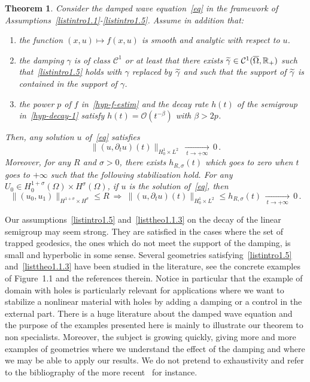 \documentclass[11pt]{article}
\newtheorem{theo}{Theorem}[section]
\theoremstyle{definition}
\numberwithin{equation}{section}
\numberwithin{figure}{section}
\numberwithin{table}{section}
\newcommand{\RR}{\mathbb{R}}
\newcommand{\Cc}{\mathcal{C}}
\newcommand{\Oc}{\mathcal{O}}
\newcommand*{\alphenumi}{\renewcommand*{\theenumi}{\alph{enumi}}}
\let\oldtilde\tilde
\renewcommand*{\tilde}[1]{\mathchoice{\widetilde{#1}}{\widetilde{#1}}{\oldtilde{#1}}{\oldtilde{#1}}}\let\oldexists\exists
\renewcommand*{\exists}{\mathrel{\oldexists}}
\begin{document}
\begin{theo}\label{th1}
Consider the damped wave equation~\eqref{eq} in the framework of Assumptions~\eqref{listintro1.1}-\eqref{listintro1.5}. Assume in addition that:
\begin{enumerate}\alphenumi
\item \label{listtheo1.1.1}the function $(x,u)\mapsto f(x,u)$ is smooth and analytic with respect to $u$.
\item \label{listtheo1.1.2}the damping $\gamma$ is of class $\Cc^1$ or at least that there exists $\tilde\gamma\in\Cc^1(\overline\Omega,\RR_+)$ such that~\eqref{listintro1.5} holds with $\gamma$ replaced by $\tilde\gamma$ and such that the support of $\tilde\gamma$ is contained in the support of $\gamma$.
\item \label{listtheo1.1.3}the power $p$ of $f$ in~\eqref{hyp-f-estim} and the decay rate $h(t)$ of the semigroup in~\eqref{hyp-decay-1} satisfy $h(t)=\Oc(t^{-\beta})$ with $\beta>2p$.
\end{enumerate}
Then, any solution $u$ of~\eqref{eq} satisfies
\[
\|(u,\partial_t u)(t)\|_{H^1_0\times L^2}\,\xrightarrow[\:t\longrightarrow
+\infty\:]{}\,0\,.
\]
Moreover, for any $R$ and $\sigma>0$, there exists $h_{R,\sigma}(t)$ which goes to zero when $t$ goes to $+\infty$ such that the following stabilization hold. For any $U_0\in H^{1+\sigma}_0(\Omega)\times H^\sigma(\Omega)$, if $u$ is the solution of~\eqref{eq}, then
\[
\|(u_0,u_1)\|_{H^{1+\sigma}\times H^\sigma}\leq
R\:\Longrightarrow\:\|(u,\partial_t u)(t)\|_{H^1_0\times L^2} \leq
h_{R,\sigma}(t)\,\xrightarrow[\:t\longrightarrow +\infty\:]{}\,0\,.
\]
\end{theo}

Our assumptions~\eqref{listintro1.5} and~\eqref{listtheo1.1.3} on the decay of the linear semigroup may seem strong. They are satisfied in the cases where the set of trapped geodesics, the ones which do not meet the support of the damping, is small and hyperbolic in some sense. Several geometries satisfying~\eqref{listintro1.5} and~\eqref{listtheo1.1.3} have been studied in the literature, see the concrete examples of Figure~1.1 and the references therein. Notice in particular that the example of domain with holes is particularly relevant for applications where we want to stabilize a nonlinear material with holes by adding a damping or a control in the external part. There is a huge literature about the damped wave equation and the purpose of the examples presented here is mainly to illustrate our theorem to non specialists. Moreover, the subject is growing quickly, giving more and more examples of geometries where we understand the effect of the damping and where we may be able to apply our results. We do not pretend to exhaustivity and refer to the bibliography of the more recent~\cite{Lin} for instance.
\end{document}
